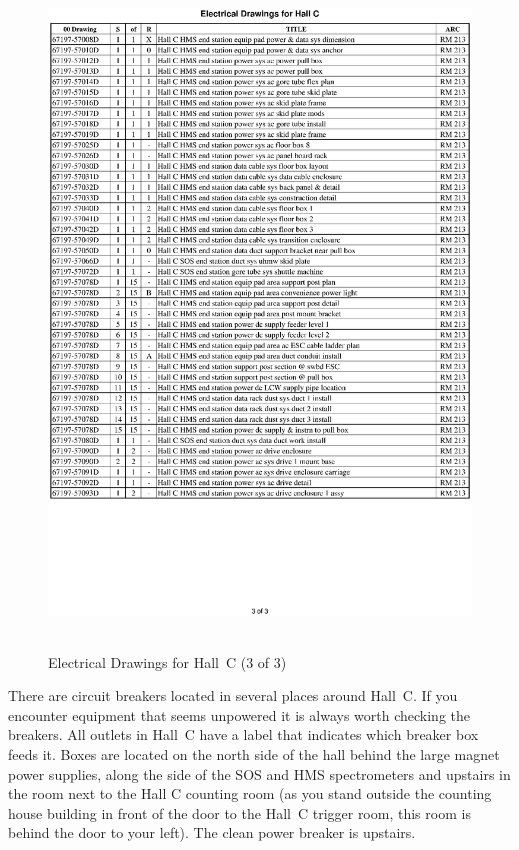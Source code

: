 \clearpage
\begin{figure}
\begin{center}
\includegraphics[height=7in]{introduction/ele3p.ps}
\caption{Electrical Drawings for Hall~C (3 of 3)}
\label{fig:elect_dwgs3}
\end{center}
\end{figure}
\clearpage


There are circuit breakers located in several places around Hall~C.
If you encounter equipment that seems unpowered it is always worth checking the
breakers. All outlets in Hall~C  have a label that indicates which
breaker box feeds it. Boxes are located on the north side of the hall behind
the large magnet power supplies, along the side of the SOS and HMS spectrometers
and upstairs in the room next to the Hall C counting room (as you stand outside the
counting house building in front of the door to the Hall~C trigger
room, this room is behind the door to your left). The clean power
breaker is upstairs.


